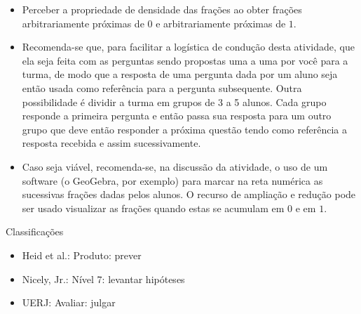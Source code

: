 \begin{multicols}{2}
\begin{itemize} %
    \item       Perceber a propriedade de densidade das frações ao obter frações 
arbitrariamente próximas de       $0$       e arbitrariamente próximas de       
$1$.
\end{itemize} %
  
  
 
\begin{itemize} %
    \item       Recomenda-se que, para facilitar a logística de condução desta 
atividade, que ela seja feita com as perguntas sendo propostas uma a uma por 
você para a turma, de modo que a resposta de uma pergunta dada por um aluno seja 
então usada como referência para a pergunta subsequente. Outra possibilidade é 
dividir a turma em grupos de 3 a 5 alunos. Cada grupo responde a primeira 
pergunta e então passa sua resposta para um outro grupo que deve então responder 
a próxima questão tendo como referência a resposta recebida e assim 
sucessivamente.
    \item       Caso seja viável, recomenda-se, na discussão da atividade, o uso 
de um software (o GeoGebra, por exemplo) para marcar na reta numérica as 
sucessivas frações dadas pelos alunos. O recurso de ampliação e redução pode ser 
usado visualizar as frações quando estas se acumulam em       $0$       e em     
  $1$.
\end{itemize} %
  
  
  Classificações  
\begin{itemize} %
    \item       Heid et al.: Produto: prever
    \item       Nicely, Jr.: Nível 7: levantar hipóteses
    \item       UERJ: Avaliar: julgar
\end{itemize} %


\end{multicols}
